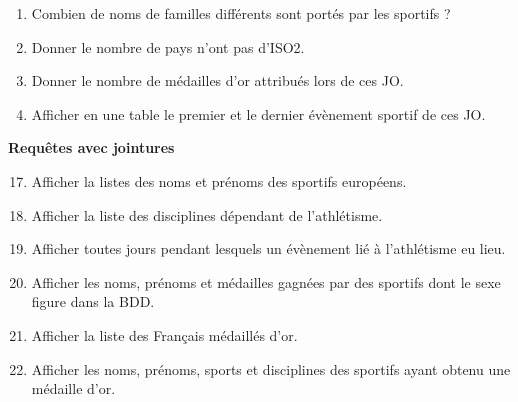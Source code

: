 \begin{exercice}[ : JO]
\begin{enumerate}
              
        \item Combien de noms de familles différents sont portés par les sportifs ?
        \item Donner le nombre de pays n'ont pas d'ISO2.
        \item Donner le nombre de médailles d'or attribués lors de ces JO.
        \item Afficher en une table le premier et le dernier évènement sportif	de ces JO.\\
    \end{enumerate}
    \textbf{Requêtes avec jointures}
    \begin{enumerate}
        \setcounter{enumi}{16}
        \item Afficher la listes des noms et prénoms des sportifs européens.
        \item Afficher la liste des disciplines dépendant de l'athlétisme.
        \item Afficher toutes jours pendant lesquels un évènement lié à l'athlétisme eu lieu.
        \item Afficher les noms, prénoms et médailles gagnées par des sportifs dont le sexe figure dans la BDD.
        \item Afficher la liste des Français médaillés d'or.
        \item Afficher les noms, prénoms, sports et disciplines des sportifs ayant obtenu une médaille d'or.
    \end{enumerate}
    
\end{exercice}